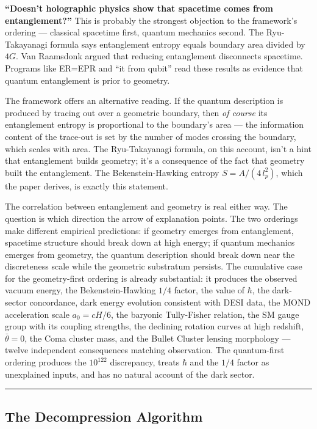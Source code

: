 \documentclass[
]{article}
\begin{document}
\textbf{``Doesn't holographic physics show that spacetime comes from
entanglement?''} This is probably the strongest objection to the
framework's ordering --- classical spacetime first, quantum mechanics
second. The Ryu-Takayanagi formula says entanglement entropy equals
boundary area divided by \(4G\). Van Raamsdonk argued that reducing
entanglement disconnects spacetime. Programs like ER=EPR and ``it from
qubit'' read these results as evidence that quantum entanglement is
prior to geometry.

The framework offers an alternative reading. If the quantum description
is produced by tracing out over a geometric boundary, then \emph{of
course} its entanglement entropy is proportional to the boundary's area
--- the information content of the trace-out is set by the number of
modes crossing the boundary, which scales with area. The Ryu-Takayanagi
formula, on this account, isn't a hint that entanglement builds
geometry; it's a consequence of the fact that geometry built the
entanglement. The Bekenstein-Hawking entropy \(S = A/(4\,l_p^2)\), which
the paper derives, is exactly this statement.

The correlation between entanglement and geometry is real either way.
The question is which direction the arrow of explanation points. The two
orderings make different empirical predictions: if geometry emerges from
entanglement, spacetime structure should break down at high energy; if
quantum mechanics emerges from geometry, the quantum description should
break down near the discreteness scale while the geometric substratum
persists. The cumulative case for the geometry-first ordering is already
substantial: it produces the observed vacuum energy, the
Bekenstein-Hawking \(1/4\) factor, the value of \(\hbar\), the
dark-sector concordance, dark energy evolution consistent with DESI
data, the MOND acceleration scale \(a_0 = cH/6\), the baryonic
Tully-Fisher relation, the SM gauge group with its coupling strengths,
the declining rotation curves at high redshift, \(\bar{\theta} = 0\),
the Coma cluster mass, and the Bullet Cluster lensing morphology ---
twelve independent consequences matching observation. The quantum-first
ordering produces the \(10^{122}\) discrepancy, treats \(\hbar\) and the
\(1/4\) factor as unexplained inputs, and has no natural account of the
dark sector.

\begin{center}\rule{0.5\linewidth}{0.5pt}\end{center}

\hypertarget{the-decompression-algorithm}{%
\subsection{The Decompression
Algorithm}\label{the-decompression-algorithm}}
\end{document}
